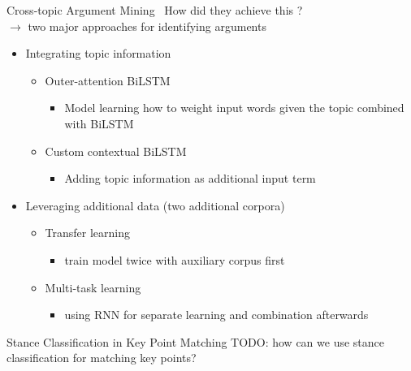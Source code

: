 \documentclass[english,handout]{mlutalk}
\begin{document}
\begin{frame}{Cross-topic Argument Mining~\cite{StabMSRG2018}}
  How did they achieve this ?\\ %
  $\rightarrow$ two major approaches for identifying arguments
  \begin{itemize}
    \item Integrating topic information
    \begin{itemize}
      \item Outer-attention BiLSTM 
      \begin{itemize}
        \item Model learning how to weight input words given the topic combined with BiLSTM
      \end{itemize}
      \item Custom contextual BiLSTM
      \begin{itemize}
        \item Adding topic information as additional input term 
      \end{itemize}
    \end{itemize}
    \item Leveraging additional data (two additional corpora)
    \begin{itemize}
      \item Transfer learning
      \begin{itemize}
        \item train model twice with auxiliary corpus first 
      \end{itemize}
      \item Multi-task learning
      \begin{itemize}
        \item using RNN for separate learning and combination afterwards
      \end{itemize}
    \end{itemize}
  \end{itemize}
\end{frame}


\begin{frame}{Stance Classification in Key Point Matching} %
  TODO: how can we use stance classification for matching key points?
  \thankyou
\end{frame}



\appendix
\section{\appendixname}

\bibliographyframe
\end{document}
